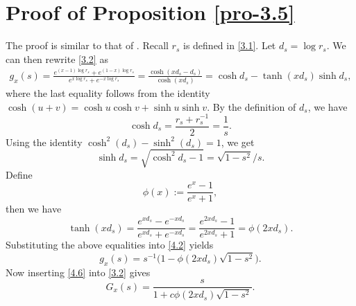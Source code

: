 \documentclass[12pt]{article}
\numberwithin{equation}{section}
\begin{document}
\section{Proof of Proposition \ref{pro-3.5}}   \label{sec4}

The proof is similar to that of \cite[Proposition 3.4]{PS}. Recall $r_s$ is defined in \eqref{3.1}.
Let $d_{s}=\log r_s$.
We can then rewrite  \eqref{3.2} as
\begin{align}\label{4.2}
g_{x}(s)=
\frac{e^{(x-1)\log r_s}+e^{(1-x)\log r_s}}{e^{x\log r_s}+e^{-x\log r_s}}
=\frac{\cosh(x d_{s} -d_{s})}{\cosh(xd_{s})}
=\cosh d_{s}-\tanh(xd_{s})\sinh d_{s},
\end{align}
where the last equality follows from the identity $\cosh (u+v)=\cosh u \cosh v+\sinh u \sinh v$.
By the definition of $d_s$,  we have
\begin{equation*}\label{4.3}
\cosh d_{s}=\frac{r_s+r^{-1}_s}2=\frac 1{s}.
\end{equation*}
Using the identity $\cosh^{2}(d_{s})-\sinh^{2}(d_{s})=1$,   we get
\begin{equation*}\label{4.5}
\sinh d_{s}=\sqrt{\cosh^{2} d_{s}-1}=\sqrt{1-s^{2}}/s.
\end{equation*}
 Define
\begin{equation*}\label{4.1}
 \phi (x) :=\frac{e^{x}-1}{e^{x}+1},
 \end{equation*}
then we have
\begin{equation*}\label{4.4}
\tanh(xd_{s})=\frac{e^{xd_{s}}-e^{-xd_{s}}}{e^{xd_{s}}+e^{-xd_{s}}}=\frac{e^{2xd_{s}}-1}{e^{2xd_{s}}+1}=\phi(2xd_{s}).
\end{equation*}
Substituting the above equalities into \eqref{4.2} yields
\begin{equation}\label{4.6}
g_{x}(s)=s^{-1}\big(1-\phi(2x d_{s})\sqrt{1-s^{2}}\big).
\end{equation}
Now inserting \eqref{4.6} into \eqref{3.2} gives
\begin{equation}\label{4.7}
G_{x}(s)=\frac{s}{1+c\phi(2xd_{s})\sqrt{1-s^{2}}}.
\end{equation}
\end{document}
